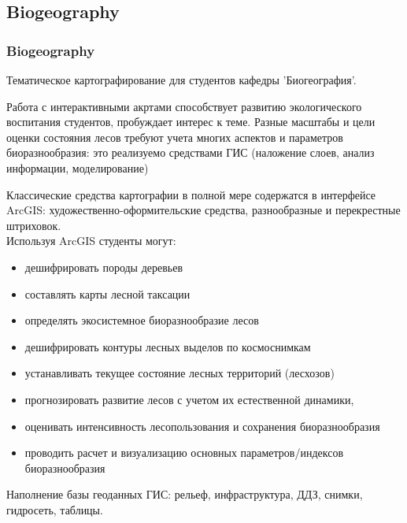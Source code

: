 \documentclass[pdflatex,compress,8pt,
	xcolor={dvipsnames,dvipsnames,svgnames,x11names,table},
	hyperref={	 
	pdfauthor={Lemenkova Polina}, 
	pdfsubject={Preentation}, 
	pdfcreator={Lemenkova Polina}, 
	pdfproducer={Lemenkova Polina}, 
	colorlinks=true,
	linkcolor=Red3, 
	citecolor=NavyBlue, 
	urlcolor = NavyBlue, 
	breaklinks = true}]{beamer}
\begin{document}
\subsection{Biogeography}
\begin{frame}\frametitle{Biogeography}
\small{
Тематическое картографирование для студентов кафедры 'Биогеография'.

\begin{alertblock}{}
Работа с интерактивными акртами способствует развитию экологического воспитания студентов, пробуждает интерес к теме. Разные масштабы и цели оценки состояния лесов требуют учета многих аспектов и параметров биоразнообразия: это реализуемо средствами ГИС (наложение слоев, анализ информации, моделирование)
\end{alertblock}

\begin{block}{}
Классические средства картографии в полной мере содержатся в  интерфейсе ArcGIS: художественно-оформительские средства, разнообразные и перекрестные штриховок. \\
Используя ArcGIS студенты могут: 
\begin{itemize}
	\item дешифрировать породы деревьев 
	\item составлять карты лесной таксации
	\item определять экосистемное биоразнообразие лесов	
	\item дешифрировать контуры лесных выделов по космоснимкам
	\item устанавливать текущее состояние лесных территорий (лесхозов)
	\item прогнозировать развитие лесов с учетом их естественной динамики,
	\item оценивать интенсивность лесопользования и сохранения биоразнообразия
	\item проводить расчет и визуализацию основных параметров/индексов биоразнообразия
\end{itemize}
Наполнение базы геоданных ГИС: рельеф, инфраструктура, ДДЗ, снимки, гидросеть, таблицы.
\end{block}
}
\end{frame}
\end{document}
